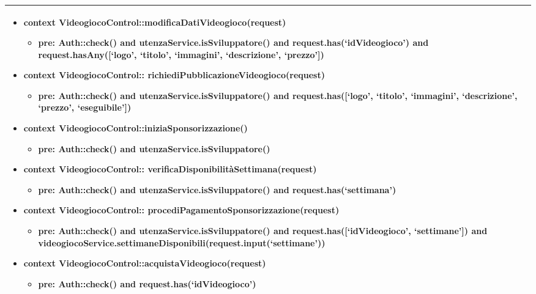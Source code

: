 \begin{tabular}{|| l | p{28.5em} ||}
\begin{itemize}[leftmargin=*]
	\item \textbf{context} VideogiocoControl::modificaDatiVideogioco(request)
	\begin{itemize}
		\item[ ] \textbf{pre:} Auth::check() and utenzaService.isSviluppatore() and request.has(‘idVideogioco’) and request.hasAny([‘logo’, ‘titolo’, ‘immagini’, ‘descrizione’, ‘prezzo’]) 
	\end{itemize} 
  
	\item \textbf{context} VideogiocoControl::\newline
	richiediPubblicazioneVideogioco(request)
	\begin{itemize}
		\item[ ] \textbf{pre:} Auth::check() and utenzaService.isSviluppatore() and request.has([‘logo’, ‘titolo’, ‘immagini’, ‘descrizione’, ‘prezzo’, ‘eseguibile’])
	\end{itemize}

	\item \textbf{context} VideogiocoControl::iniziaSponsorizzazione()
	\begin{itemize}
		\item[ ] \textbf{pre:} Auth::check() and utenzaService.isSviluppatore()
	\end{itemize}

	\item \textbf{context} VideogiocoControl::\newline
	verificaDisponibilitàSettimana(request)
	\begin{itemize}
		\item[ ] \textbf{pre:} Auth::check() and utenzaService.isSviluppatore() and request.has(‘settimana’) 
	\end{itemize}
	
	\item \textbf{context} VideogiocoControl::\newline
	procediPagamentoSponsorizzazione(request)
	\begin{itemize}
		\item[ ] \textbf{pre:} Auth::check() and utenzaService.isSviluppatore() and request.has([‘idVideogioco’, ‘settimane’]) and videogiocoService.settimaneDisponibili(request.input(‘settimane’))
	\end{itemize}

	\item \textbf{context} VideogiocoControl::acquistaVideogioco(request)
	\begin{itemize}
		\item[ ] \textbf{pre:} Auth::check() and request.has(‘idVideogioco’)
	\end{itemize}
\end{itemize}\\
\hline
\end{tabular}

